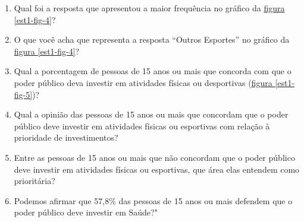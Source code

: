 \documentclass[10 pt,usenames,dvipsnames, oneside]{article}
\begin{document}
\begin{enumerate}
\item {} 
Qual foi a resposta que apresentou a maior frequência no gráfico da \hyperref[est1-fig-4]{figura \ref{est1-fig-4}}?

\item {} 
O que você acha que representa a resposta “Outros Esportes” no gráfico da \hyperref[est1-fig-4]{figura \ref{est1-fig-4}}?

\item {} 
Qual a porcentagem de pessoas de 15 anos ou mais que concorda com que o poder público deva investir em atividades físicas ou desportivas (\hyperref[est1-fig-5]{figura \ref{est1-fig-5}})?

\item {} 
Qual a opinião das pessoas de 15 anos ou mais que concordam que o poder público deve investir em atividades físicas ou esportivas com relação à prioridade de investimentos?

\item {} 
Entre as pessoas de 15 anos ou mais que não concordam que o poder público deve investir em atividades físicas ou esportivas, que área elas entendem como prioritária?

\item {} 
Podemos afirmar que 57,8\% das pessoas de 15 anos ou mais defendem que o poder público deve investir em Saúde?"

\end{enumerate}
\end{document}

